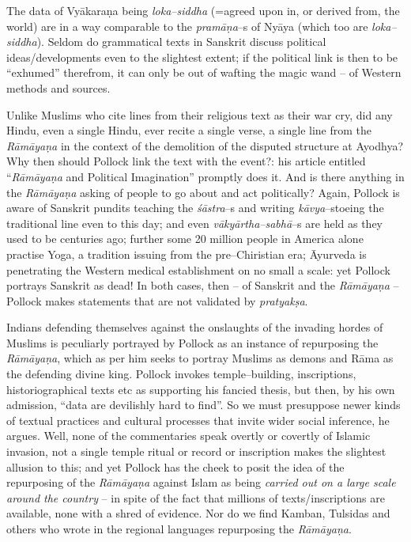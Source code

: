 The data of Vyākaraṇa being \textit{loka–siddha} (=agreed upon in, or derived from, the world) are in a way comparable to the \textit{pramāṇa}–s of Nyāya (which too are \textit{loka–siddha}). Seldom do grammatical texts in Sanskrit discuss political ideas/developments even to the slightest extent; if the political link is then to be “exhumed” therefrom, it can only be out of wafting the magic wand – of Western methods and sources.

Unlike Muslims who cite lines from their religious text as their war cry, did any Hindu, even a single Hindu, ever recite a single verse, a single line from the \textit{Rāmāyaṇa} in the context of the demolition of the disputed structure at Ayodhya? Why then should Pollock link the text with the event?: his article entitled “\textit{Rāmāyaṇa} and Political Imagination” promptly does it. And is there anything in the \textit{Rāmāyaṇa} asking of people to go about and act politically? Again, Pollock is aware of Sanskrit pundits teaching the \textit{śāstra}–s and writing \textit{kāvya}–s\break toeing the traditional line even to this day; and even \textit{vākyārtha–sabhā}–s are held as they used to be centuries ago; further some 20 million people in America alone practise Yoga, a tradition issuing from the pre–Chiristian era; Āyurveda is penetrating the Western medical establishment on no small a scale: yet Pollock portrays Sanskrit as dead! In both cases, then – of Sanskrit and the \textit{Rāmāyaṇa} – Pollock makes statements that are not validated by \textit{pratyakṣa}.

Indians defending themselves against the onslaughts of the invading hordes of Muslims is peculiarly portrayed by Pollock as an instance of repurposing the \textit{Rāmāyaṇa}, which as per him seeks to portray Muslims as demons and Rāma as the defending divine king. Pollock invokes temple–building, inscriptions, historiographical texts etc as supporting his fancied thesis, but then, by his own admission, “data are devilishly hard to find”. So we must presuppose newer kinds of textual practices and cultural processes that invite wider social inference, he argues. Well, none of the commentaries speak overtly or covertly of Islamic invasion, not a single temple ritual or record or inscription makes the slightest allusion to this; and yet Pollock has the cheek to posit the idea of the repurposing of the \textit{Rāmāyaṇa} against Islam as being \textit{carried out on a large scale around the country} – in spite of the fact that millions of texts/inscriptions are available, none with a shred of evidence. Nor do we find Kamban, Tulsidas and others who wrote in the regional languages repurposing the \textit{Rāmāyaṇa}.

